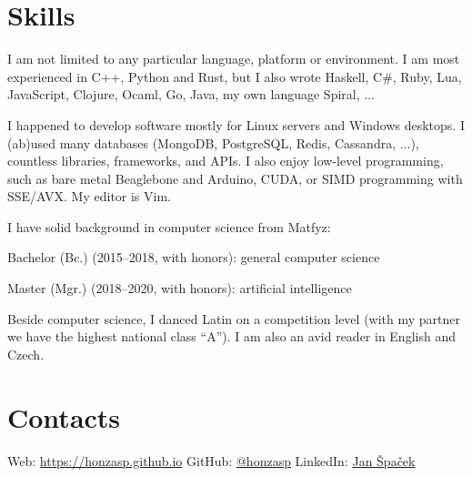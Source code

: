 \documentclass[11pt,a4paper]{article}
\begin{document}
\begin{multicols}{2}
\section*{Skills}

I am not limited to any particular language, platform or environment. I am most
experienced in C++, Python and Rust, but I also wrote
{\small Haskell, C\#, Ruby,}
{\footnotesize Lua, JavaScript,}
{\scriptsize Clojure, Ocaml, Go, Java, my own language Spiral, ...}

I happened to develop software mostly for Linux servers and Windows desktops. I
(ab)used many databases (MongoDB, PostgreSQL, Redis, Cassandra, ...), countless
libraries, frameworks, and APIs. I also enjoy low-level programming, such as
bare metal Beaglebone and Arduino, CUDA, or SIMD programming with SSE/AVX. My
editor is Vim.

I have solid background in computer science from Matfyz:
\begin{compactitem}
\item Bachelor (Bc.) (2015–2018, with honors): general computer science
\item Master (Mgr.) (2018–2020, with honors): artificial intelligence
\end{compactitem}

Beside computer science, I danced Latin on a competition level (with my partner
we have the highest national class ``A''). I am also an avid reader in English and
Czech.

\section*{Contacts}

Web: \url{https://honzasp.github.io}\newline
GitHub: \href{https://github.com/honzasp}{@honzasp}\newline
LinkedIn: \href{https://www.linkedin.com/in/jan-%C5%A1pa%C4%8Dek-3155b4136/}{Jan
Špaček}\newline

\end{multicols}
\end{document}
